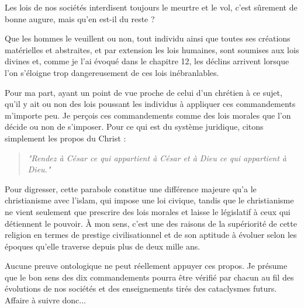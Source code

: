 Les lois de nos sociétés interdisent toujours le meurtre et le vol, c’est sûrement de bonne augure, mais qu’en est-il du reste ?

Que les hommes le veuillent ou non, tout individu ainsi que toutes ses créations matérielles et abstraites, et par extension les lois humaines, sont soumises aux lois divines et, comme je l’ai évoqué dans le chapitre 12, les déclins arrivent lorsque l’on s’éloigne trop dangereusement de ces lois inébranlables.

Pour ma part, ayant un point de vue proche de celui d’un chrétien à ce sujet, qu’il y ait ou non des lois poussant les individus à appliquer ces commandements m’importe peu. Je perçois ces commandements comme des lois morales que l’on décide ou non de s’imposer. Pour ce qui est du système juridique, citons simplement les propos du Christ : \begin{quote}\textit{"Rendez à César ce qui appartient à César et à Dieu ce qui appartient à Dieu."}\end{quote}

Pour digresser, cette parabole constitue une différence majeure qu'a le christianisme avec l'islam, qui impose une loi civique, tandis que le christianisme ne vient seulement que prescrire des lois morales et laisse le législatif à ceux qui détiennent le pouvoir. À mon sens, c'est une des raisons de la supériorité de cette religion en termes de prestige civilisationnel et de son aptitude à évoluer selon les époques qu'elle traverse depuis plus de deux mille ans.

Aucune preuve ontologique ne peut réellement appuyer ces propos. Je présume que le bon sens des dix commandements pourra être vérifié par chacun au fil des évolutions de nos sociétés et des enseignements tirés des cataclysmes futurs. Affaire à suivre donc...